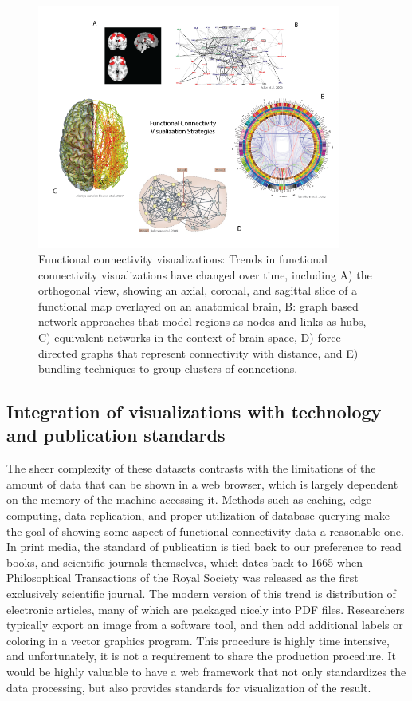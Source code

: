 \documentclass{report}
\begin{document}
\begin{figure}[ht!]
\begin{center}
\includegraphics[width=10cm]{images/figure62.png}
\end{center}
\caption{ \label{fig:62} Functional connectivity visualizations:  Trends in functional connectivity visualizations have changed over time, including A) the orthogonal view, showing an axial, coronal, and sagittal slice of a functional map overlayed on an anatomical brain, B: graph based network approaches that model regions as nodes and links as hubs, C) equivalent networks in the context of brain space, D) force directed graphs that represent connectivity with distance, and E) bundling techniques to group clusters of connections.
 \newline \newline}
\end{figure} 


\subsection{Integration of visualizations with technology and publication standards}
The sheer complexity of these datasets contrasts with the limitations of the amount of data that can be shown in a web browser, which is largely dependent on the memory of the machine accessing it.  Methods such as caching, edge computing, data replication, and proper utilization of database querying make the goal of showing some aspect of functional connectivity data a reasonable one.  In print media, the standard of publication is tied back to our preference to read books, and scientific journals themselves, which dates back to 1665 when Philosophical Transactions of the Royal Society was released as the first exclusively scientific journal.  The modern version of this trend is distribution of electronic articles, many of which are packaged nicely into PDF files.  Researchers typically export an image from a software tool, and then add additional labels or coloring in a vector graphics program.  This procedure is highly time intensive, and unfortunately, it is not a requirement to share the production procedure.  It would be highly valuable to have a web framework that not only standardizes the data processing, but also provides standards for visualization of the result.   
\end{document}
